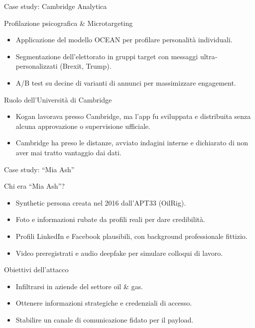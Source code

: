\documentclass[12pt]{beamer}
\begin{document}
\begin{frame}{Case study: Cambridge Analytica}
  \begin{alertblock}{Profilazione psicografica \& Microtargeting}
    \begin{itemize}
      \item Applicazione del modello OCEAN per profilare personalità individuali.
      \item Segmentazione dell’elettorato in gruppi target con messaggi ultra‐personalizzati (Brexit, Trump).
      \item A/B test su decine di varianti di annunci per massimizzare engagement.\cite{cambridge_vox}
    \end{itemize}
  \end{alertblock}
  \begin{alertblock}{Ruolo dell’Università di Cambridge}
    \begin{itemize}
      \item Kogan lavorava presso Cambridge, ma l’app fu sviluppata e distribuita senza alcuna approvazione o supervisione ufficiale.
      \item Cambridge ha preso le distanze, avviato indagini interne e dichiarato di non aver mai tratto vantaggio dai dati.
    \end{itemize}
  \end{alertblock}
\end{frame}




\begin{frame}{Case study: “Mia Ash” }
  \begin{alertblock}{Chi era “Mia Ash”?}
    \begin{itemize}
      \item Synthetic persona creata nel 2016 dall’APT33 (OilRig).
      \item Foto e informazioni rubate da profili reali per dare credibilità.
      \item Profili LinkedIn e Facebook plausibili, con background professionale fittizio.
      \item Video preregistrati e audio deepfake per simulare colloqui di lavoro.\cite{mia_secureworks}
    \end{itemize}
  \end{alertblock}
  \begin{alertblock}{Obiettivi dell’attacco}
    \begin{itemize}
      \item Infiltrarsi in aziende del settore oil & gas.
      \item Ottenere informazioni strategiche e credenziali di accesso.
      \item Stabilire un canale di comunicazione fidato per il payload.
    \end{itemize}
  \end{alertblock}
\end{frame}
\end{document}

